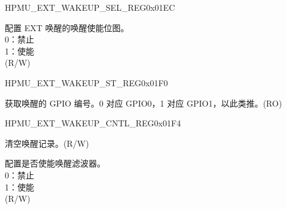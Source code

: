 \begin{register}{H}{PMU\_EXT\_WAKEUP\_SEL\_REG}{0x01EC}\label{regdesc:PMUEXTWAKEUPSELREG}
%
\regnewline%
\begin{regdesc}\begin{reglist}
\label{fielddesc:PMUEXTWAKEUPSEL}\item [PMU\_EXT\_WAKEUP\_SEL] 配置 EXT 唤醒的唤醒使能位图。\\
0：禁止 \\
1：使能 \\
(R/W)

\end{reglist}\end{regdesc}
\end{register}


\begin{register}{H}{PMU\_EXT\_WAKEUP\_ST\_REG}{0x01F0}\label{regdesc:PMUEXTWAKEUPSTREG}
%
\regnewline%
\begin{regdesc}\begin{reglist}
\label{fielddesc:PMUEXTWAKEUPSTATUS}\item [PMU\_EXT\_WAKEUP\_STATUS] 获取唤醒的 GPIO 编号。0 对应 GPIO0，1 对应 GPIO1，以此类推。(RO)
\end{reglist}\end{regdesc}
\end{register}


\begin{register}{H}{PMU\_EXT\_WAKEUP\_CNTL\_REG}{0x01F4}\label{regdesc:PMUEXTWAKEUPCNTLREG}
%
%
%
\regnewline%
\begin{regdesc}\begin{reglist}
\label{fielddesc:PMUEXTWAKEUPSTATUSCLR}\item [PMU\_EXT\_WAKEUP\_STATUS\_CLR] 清空唤醒记录。(R/W)
\label{fielddesc:PMUEXTWAKEUPFILTER}\item [PMU\_EXT\_WAKEUP\_FILTER] 配置是否使能唤醒滤波器。\\
0：禁止 \\
1：使能 \\
(R/W)
\end{reglist}\end{regdesc}
\end{register}


